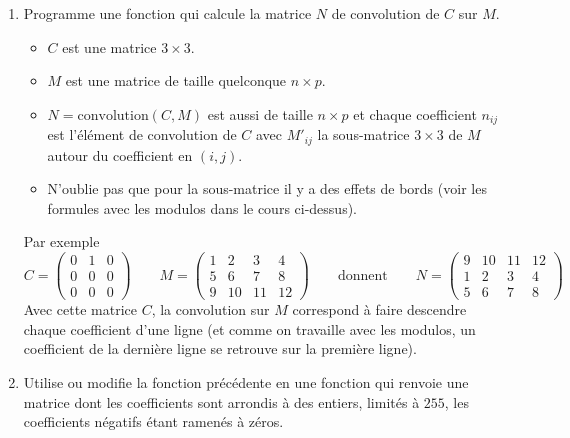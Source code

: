 \documentclass[11pt,class=report,crop=false]{standalone}
\begin{document}
\begin{activite}
\begin{enumerate}
	\item Programme une fonction  qui calcule la matrice $N$ de convolution de $C$ sur $M$.
	\begin{itemize}
		\item $C$ est une matrice $3\times 3$.
		\item $M$ est une matrice de taille quelconque $n\times p$.
		\item $N = \text{convolution}(C,M)$ est aussi de taille $n \times p$ et chaque coefficient $n_{ij}$ est l'élément de convolution de $C$ avec $M'_{ij}$ la sous-matrice $3\times 3$ de $M$ autour du coefficient en $(i,j)$.
		\item N'oublie pas que pour la sous-matrice il y a des effets de bords (voir les formules avec les modulos dans le cours ci-dessus).
	\end{itemize}
	Par exemple 
	$$
	C = \begin{pmatrix}0&1&0\\0&0&0\\0&0&0\end{pmatrix}\qquad
	M = \begin{pmatrix}1&2&3&4\\5&6&7&8\\9&10&11&12\end{pmatrix}\qquad	
	\text {donnent} \qquad
	N = \begin{pmatrix}9&10&11&12\\1&2&3&4\\5&6&7&8\end{pmatrix}$$
	Avec cette matrice $C$, la convolution sur $M$ correspond à faire descendre chaque coefficient d'une ligne (et comme on travaille avec les modulos, un coefficient de la dernière ligne se retrouve sur la première ligne).
	
	
	\item Utilise ou modifie la fonction précédente en une fonction  qui renvoie une matrice dont les coefficients sont arrondis à des entiers, limités à $255$, les coefficients négatifs étant ramenés à zéros.
	

\end{enumerate}
\end{activite}
\end{document}
